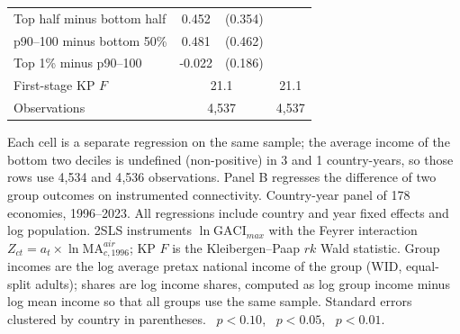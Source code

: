\begin{table}[p]
\begin{threeparttable}
\begin{tabular}{lcccc}
Top half minus bottom half & 0.452 & (0.354) & & \\
p90--100 minus bottom 50\% & 0.481 & (0.462) & & \\
Top 1\% minus p90--100 & -0.022 & (0.186) & & \\
\midrule
First-stage KP $F$ & \multicolumn{2}{c}{21.1} & \multicolumn{2}{c}{21.1} \\
Observations & \multicolumn{2}{c}{4{,}537} & \multicolumn{2}{c}{4{,}537} \\
\bottomrule
\end{tabular}
\begin{tablenotes}\small
\item Each cell is a separate regression on the same sample; the average income of the bottom two deciles is undefined (non-positive) in 3 and 1 country-years, so those rows use 4{,}534 and 4{,}536 observations. Panel B regresses the difference of two group outcomes on instrumented connectivity. Country-year panel of 178 economies, 1996--2023. All regressions include country and year fixed effects and log population. 2SLS instruments $\ln\mathrm{GACI}_{max}$ with the Feyrer interaction $Z_{ct}=a_t\times\ln\mathrm{MA}^{air}_{c,1996}$; KP $F$ is the Kleibergen--Paap $rk$ Wald statistic. Group incomes are the log average pretax national income of the group (WID, equal-split adults); shares are log income shares, computed as log group income minus log mean income so that all groups use the same sample. Standard errors clustered by country in parentheses. \sym{*}~$p<0.10$, \sym{**}~$p<0.05$, \sym{***}~$p<0.01$.
\end{tablenotes}
\end{threeparttable}
\end{table}
